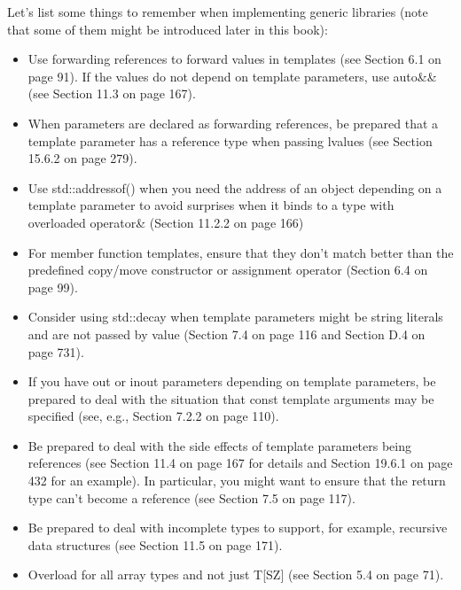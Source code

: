 Let’s list some things to remember when implementing generic libraries (note that some of them might be introduced later in this book):

\begin{itemize}
\item 
Use forwarding references to forward values in templates (see Section 6.1 on page 91). If the values do not depend on template parameters, use auto\&\& (see Section 11.3 on page 167).

\item 
When parameters are declared as forwarding references, be prepared that a template parameter has a reference type when passing lvalues (see Section 15.6.2 on page 279).

\item 
Use std::addressof() when you need the address of an object depending on a template parameter to avoid surprises when it binds to a type with overloaded operator\& (Section 11.2.2 on page 166)

\item 
For member function templates, ensure that they don’t match better than the predefined copy/move constructor or assignment operator (Section 6.4 on page 99).

\item 
Consider using std::decay when template parameters might be string literals and are not passed by value (Section 7.4 on page 116 and Section D.4 on page 731).

\item 
If you have out or inout parameters depending on template parameters, be prepared to deal with the situation that const template arguments may be specified (see, e.g., Section 7.2.2 on page 110).

\item 
Be prepared to deal with the side effects of template parameters being references (see Section 11.4 on page 167 for details and Section 19.6.1 on page 432 for an example). In particular, you might want to ensure that the return type can’t become a reference (see Section 7.5 on page 117).

\item 
Be prepared to deal with incomplete types to support, for example, recursive data structures (see Section 11.5 on page 171).

\item 
Overload for all array types and not just T[SZ] (see Section 5.4 on page 71).
\end{itemize}